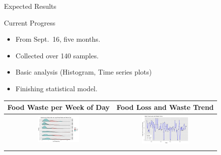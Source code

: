 \documentclass{beamer}
\begin{document}
\begin{frame}{Expected Results}
    \begin{block}{Current Progress}
        \begin{itemize}
            \item From Sept.~16, five months.
            \item Collected over 140 samples.
            \item Basic analysis (Histogram, Time series plots)
            \item Finishing statistical model.
        \end{itemize}

        \begin{table}[]
            \begin{tabular}{cc}
                \hline
                    \small Food Waste per Week of Day & Food Loss and Waste Trend \\ \hline
                    \includegraphics[width=2.2cm]{weekFW.png}
                    & 
                    \includegraphics[width=2.5cm]{tsFLW.png}\\
                    &      \\
                \hline
            \end{tabular}
        \end{table}
    \end{block}
\end{frame}
\end{document}
